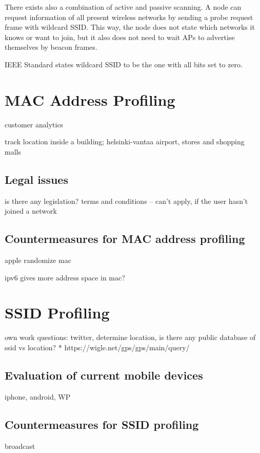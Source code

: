 \documentclass[12pt,a4paper,oneside,pdftex]{report}
\begin{document}
There exists also a combination of active and passive scanning. A node can request information of all present wireless networks by sending a probe request frame with wildcard SSID. This way, the node does not state which networks it knows or want to join, but it also does not need to wait APs to advertise themselves by beacon frames.

IEEE Standard states wildcard SSID to be the one with all bits set to zero. 


\chapter{MAC Address Profiling}
\label{chapter:mac}

customer analytics

track location inside a building; helsinki-vantaa airport, stores and shopping malls

\section{Legal issues}
is there any legislation? terms and conditions -- can't apply, if the user hasn't joined a network

\section{Countermeasures for MAC address profiling}
\label{sec:countermeasures_mac}
apple randomize mac

ipv6 gives more address space in mac?

\chapter{SSID Profiling}
\label{chapter:ssid}

own work
questions: twitter, determine location, is there any public database of ssid vs location?
* https://wigle.net/gps/gps/main/query/

\section{Evaluation of current mobile devices}
\label{sec:evaluation}
iphone, android, WP


\section{Countermeasures for SSID profiling}
\label{sec:countermeasures_ssid}
broadcast
\end{document}
